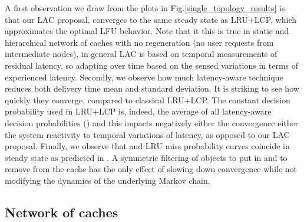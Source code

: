 \documentclass[conference]{IEEEtran}
\begin{document}
\begin{figure*}[htbp] 
\centering
{}
\caption{Single cache topology simulation: LAasym decreases LRU delivery time by 30\% and outperforms LRU+LCP on convergence.}
\label{single_topology_results}
\end{figure*}
A first observation we draw from the plots in Fig.\ref{single_topology_results} is that our LAC proposal,  converges to the same steady state as LRU+LCP, which approximates the optimal LFU behavior.
Note that it this is true in static and hierarchical network of caches with no regeneration (no user requests from intermediate nodes), in general LAC is based on temporal measurements of residual latency, so adapting over time based on the sensed variations in terms of experienced latency. 
Secondly, we observe how much  latency-aware technique reduces both delivery time mean and standard deviation. It is striking to see how quickly they converge, compared to classical LRU+LCP.
The constant decision probability used in LRU+LCP is, indeed, the average of all latency-aware decision probabilities () 
and this impacts negatively either the convergence either the system reactivity to temporal variations of latency, as opposed to our LAC proposal. 
Finally, we observe that  and LRU miss probability curves coincide in steady state as predicted in \cite{Jelenkovic:2004:OLC:1024662.1024670}. A symmetric filtering of objects to put in and to remove from the cache has the only effect of slowing down convergence while not modifying the dynamics of the underlying Markov chain. 

\subsection{Network of caches}
\end{document}
